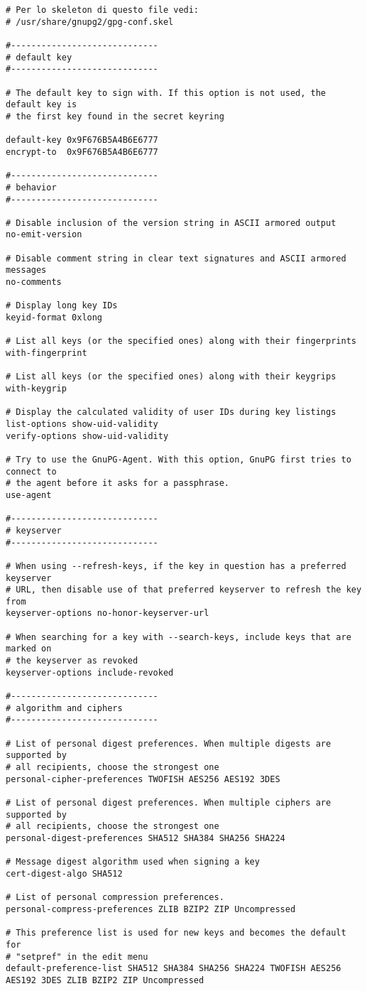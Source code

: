 \documentclass[a4paper,10pt]{article}
\begin{document}
\begin{verbatim}
# Per lo skeleton di questo file vedi:
# /usr/share/gnupg2/gpg-conf.skel

#-----------------------------
# default key
#-----------------------------

# The default key to sign with. If this option is not used, the default key is
# the first key found in the secret keyring

default-key 0x9F676B5A4B6E6777
encrypt-to  0x9F676B5A4B6E6777

#-----------------------------
# behavior
#-----------------------------

# Disable inclusion of the version string in ASCII armored output
no-emit-version

# Disable comment string in clear text signatures and ASCII armored messages
no-comments

# Display long key IDs
keyid-format 0xlong

# List all keys (or the specified ones) along with their fingerprints
with-fingerprint

# List all keys (or the specified ones) along with their keygrips
with-keygrip

# Display the calculated validity of user IDs during key listings
list-options show-uid-validity
verify-options show-uid-validity

# Try to use the GnuPG-Agent. With this option, GnuPG first tries to connect to
# the agent before it asks for a passphrase.
use-agent

#-----------------------------
# keyserver
#-----------------------------

# When using --refresh-keys, if the key in question has a preferred keyserver
# URL, then disable use of that preferred keyserver to refresh the key from
keyserver-options no-honor-keyserver-url

# When searching for a key with --search-keys, include keys that are marked on
# the keyserver as revoked
keyserver-options include-revoked

#-----------------------------
# algorithm and ciphers
#-----------------------------

# List of personal digest preferences. When multiple digests are supported by
# all recipients, choose the strongest one
personal-cipher-preferences TWOFISH AES256 AES192 3DES

# List of personal digest preferences. When multiple ciphers are supported by
# all recipients, choose the strongest one
personal-digest-preferences SHA512 SHA384 SHA256 SHA224

# Message digest algorithm used when signing a key
cert-digest-algo SHA512

# List of personal compression preferences.
personal-compress-preferences ZLIB BZIP2 ZIP Uncompressed

# This preference list is used for new keys and becomes the default for
# "setpref" in the edit menu
default-preference-list SHA512 SHA384 SHA256 SHA224 TWOFISH AES256 AES192 3DES ZLIB BZIP2 ZIP Uncompressed
\end{verbatim}
\end{document}

